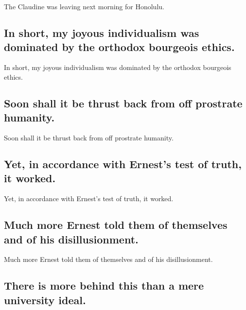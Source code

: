 \documentclass[]{article}
\begin{document}
The Claudine was leaving next morning for Honolulu.

\hypertarget{in-short-my-joyous-individualism-was-dominated-by-the-orthodox-bourgeois-ethics.}{%
\subsection{In short, my joyous individualism was dominated by the
orthodox bourgeois
ethics.}\label{in-short-my-joyous-individualism-was-dominated-by-the-orthodox-bourgeois-ethics.}}

In short, my joyous individualism was dominated by the orthodox
bourgeois ethics.

\hypertarget{soon-shall-it-be-thrust-back-from-off-prostrate-humanity.}{%
\subsection{Soon shall it be thrust back from off prostrate
humanity.}\label{soon-shall-it-be-thrust-back-from-off-prostrate-humanity.}}

Soon shall it be thrust back from off prostrate humanity.

\hypertarget{yet-in-accordance-with-ernests-test-of-truth-it-worked.}{%
\subsection{Yet, in accordance with Ernest's test of truth, it
worked.}\label{yet-in-accordance-with-ernests-test-of-truth-it-worked.}}

Yet, in accordance with Ernest's test of truth, it worked.

\hypertarget{much-more-ernest-told-them-of-themselves-and-of-his-disillusionment.}{%
\subsection{Much more Ernest told them of themselves and of his
disillusionment.}\label{much-more-ernest-told-them-of-themselves-and-of-his-disillusionment.}}

Much more Ernest told them of themselves and of his disillusionment.

\hypertarget{there-is-more-behind-this-than-a-mere-university-ideal.}{%
\subsection{There is more behind this than a mere university
ideal.}\label{there-is-more-behind-this-than-a-mere-university-ideal.}}
\end{document}
